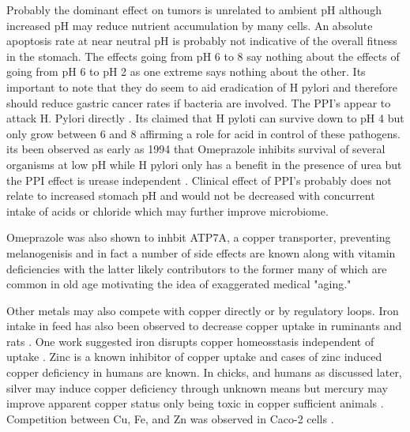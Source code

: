 {
Probably the dominant effect on tumors is unrelated to ambient
pH although increased pH may reduce nutrient
accumulation by many cells. An absolute apoptosis rate
at near neutral pH is probably not indicative of the
overall fitness in the stomach. 
The effects going from pH 6 to 8 say nothing about the effects
of going from pH 6 to pH 2 as one extreme says nothing about the other. 
Its important to note that they do seem to aid eradication of
H pylori and therefore should reduce gastric cancer rates
if bacteria are involved.
The PPI's appear to attack H. Pylori directly 
\cite{Saniee_Shahreza_Siavoshi_Negative_Effect_Protonpump_2016}
\cite{Atif_Hatefi_Arven_Consumption_antibacterial_2024}
. Its claimed that H pyloti can  survive down to pH 4 but only grow
between 6 and 8 \cite{Marcus2023} affirming a role for
acid in control of these pathogens. 
its been observed as early as  1994 that Omeprazole inhibits
survival of several organisms at low pH while H pylori
only has a benefit in the presence of urea
but the PPI effect is urease independent
\cite{McGowan_Cover_Blaser_proton_pump_inhibitor_1994}.
Clinical effect  of PPI's probably does not relate to increased
stomach pH and would  not be decreased with concurrent
intake of acids or chloride which may further improve microbiome.

Omeprazole was also shown to inhbit ATP7A, a copper transporter,
preventing melanogenisis 
\cite{Matsui_Petris_Niki_Omeprazole_Gastric_Proton_2015}
and in fact a number of side effects are known 
along with vitamin deficiencies 
\cite{PMC10248387} with the latter likely contributors to the former
many of which are common in old age motivating the idea of exaggerated
medical "aging."  

Other metals may also compete with copper directly or
by regulatory loops.
Iron intake in feed has also been observed to decrease
copper uptake in ruminants 
\cite{Clarkson_Paine_Kendall_Evaluation_solubility_2021} 
and rats
\cite{Lee_Ha_Collins_Dietary_Iron_Intake_2021}
.
One work suggested  iron disrupts copper homeosstasis
independent of uptake
\cite{Ha_Doguer_Collins_Consumption_high_2017}.
Zinc is a known inhibitor of copper uptake
and cases of zinc induced copper deficiency in humans
are known\cite{PMC7495772}.
In chicks, and humans as discussed later, silver may induce
copper deficiency through unknown means but mercury
may improve apparent copper status only being toxic 
in copper sufficient animals
\cite{Hill_Starcher_Matrone_Mercury_Silver_Interrelationships_1964}.
Competition between Cu, Fe, and Zn was observed in Caco-2
cells \cite{ARREDONDO_MARTINEZ_NUNEZ_Inhibition_iron_2006}.

}
